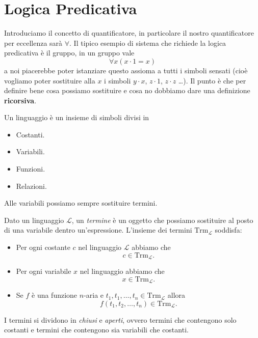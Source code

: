\documentclass[11pt]{scrartcl}
\begin{document}
	\section{Logica Predicativa}
	Introduciamo il concetto di quantificatore, in particolare il nostro quantificatore per eccellenza sarà $\forall$.
	Il tipico esempio di sistema che richiede la logica predicativa è il gruppo, in un gruppo vale
	$$\forall x (x\cdot 1 = x)$$
	a noi piacerebbe poter istanziare questo assioma a tutti i simboli sensati (cioè vogliamo poter sostituire alla $x$ i simboli $y\cdot x$, $z\cdot 1$, $z\cdot z$ \dots). Il punto è che per definire bene cosa possiamo sostituire e cosa no dobbiamo dare una definizione \textbf{ricorsiva}.
	\begin{definition}[Linguaggio]
		Un linguaggio è un insieme di simboli divisi in
		\begin{itemize}
			\item Costanti.
			\item Variabili.
			\item Funzioni.
			\item Relazioni.
		\end{itemize}
		Alle variabili possiamo sempre sostituire termini.
	\end{definition}
	\begin{definition}[Termine]
		Dato un linguaggio $\mathcal{L}$, un \textit{termine} è un oggetto che possiamo sostituire al posto di una variabile dentro un'espressione. L'insieme dei termini $\text{Trm}_\mathcal{L}$ soddisfa:
		\begin{itemize}
			\item Per ogni costante $c$ nel linguaggio $\mathcal{L}$ abbiamo che $$c\in \text{Trm}_\mathcal{L}.$$
			\item Per ogni variabile $x$ nel linguaggio abbiamo che $$x\in \text{Trm}_\mathcal{L}.$$
			\item Se $f$ è una funzione $n$-aria e $t_1,t_1,\dots,t_n\in \text{Trm}_{\mathcal{L}}$ allora
			$$f(t_1,t_2,\dots,t_n)\in\text{Trm}_{\mathcal{L}}.$$ 
		\end{itemize}
		I termini si dividono in \textit{chiusi} e \textit{aperti}, ovvero termini che contengono solo costanti e termini che contengono sia variabili che costanti.
	\end{definition}
\end{document}
